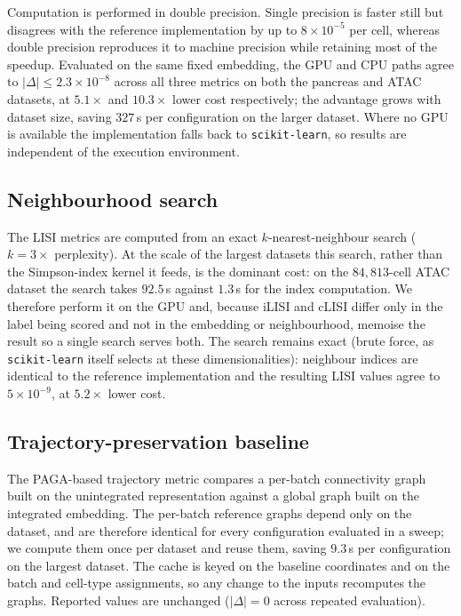 \documentclass[11pt, a4paper]{article}
\begin{document}
Computation is performed in double precision. Single precision is faster still but
disagrees with the reference implementation by up to $8 \times 10^{-5}$ per cell, whereas
double precision reproduces it to machine precision while retaining most of the speedup.
Evaluated on the same fixed embedding, the GPU and CPU paths agree to
$|\Delta| \leq 2.3 \times 10^{-8}$ across all three metrics on both the pancreas and ATAC
datasets, at $5.1\times$ and $10.3\times$ lower cost respectively; the advantage grows
with dataset size, saving $327$\,s per configuration on the larger dataset. Where no GPU
is available the implementation falls back to \texttt{scikit-learn}, so results are
independent of the execution environment.

\subsection*{Neighbourhood search}

The LISI metrics are computed from an exact $k$-nearest-neighbour search
($k = 3 \times$ perplexity). At the scale of the largest datasets this search, rather
than the Simpson-index kernel it feeds, is the dominant cost: on the $84{,}813$-cell ATAC
dataset the search takes $92.5$\,s against $1.3$\,s for the index computation. We
therefore perform it on the GPU and, because iLISI and cLISI differ only in the label
being scored and not in the embedding or neighbourhood, memoise the result so a single
search serves both. The search remains exact (brute force, as
\texttt{scikit-learn} itself selects at these dimensionalities): neighbour indices are
identical to the reference implementation and the resulting LISI values agree to
$5 \times 10^{-9}$, at $5.2\times$ lower cost.

\subsection*{Trajectory-preservation baseline}

The PAGA-based trajectory metric compares a per-batch connectivity graph built on the
unintegrated representation against a global graph built on the integrated embedding.
The per-batch reference graphs depend only on the dataset, and are therefore identical
for every configuration evaluated in a sweep; we compute them once per dataset and reuse
them, saving $9.3$\,s per configuration on the largest dataset. The cache is keyed on the
baseline coordinates and on the batch and cell-type assignments, so any change to the
inputs recomputes the graphs. Reported values are unchanged
($|\Delta| = 0$ across repeated evaluation).
\end{document}
